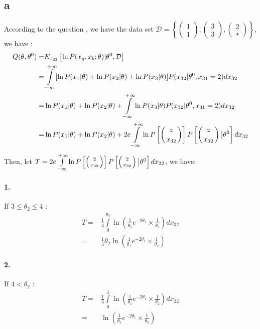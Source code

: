 \documentclass[]{article}
\begin{document}
    \subsection{a}
According to the question , we have the data set $\mathcal{D} = \left\{ \left(\begin{aligned}1\\1\end{aligned}\right),\left(\begin{aligned}3\\3\end{aligned}\right),\left(\begin{aligned}2\\\star\end{aligned}\right)\right\}$, we have :
\begin{align*}
	Q(\theta, \theta^0) =& E_{x_{32}} \left[ \ln P(x_g,x_b;\theta)|\theta^0,\mathcal{D} \right]\\
	=& \int \limits_{- \infty}^{+ \infty} [\ln P(x_1 |\theta) +\ln P(x_2|\theta) + \ln P(x_3|\theta)]P(x_{32}|\theta^0,x_{31} = 2)dx_{32} \\
	=&\ln P(x_1 |\theta) +\ln P(x_2|\theta) +  \int \limits_{- \infty}^{+ \infty} \ln P(x_3|\theta)P(x_{32}|\theta^0,x_{31} = 2)dx_{32} \\
	=&\ln P(x_1|\theta)+\ln P(x_2|\theta)+2e\int \limits_{- \infty}^{+ \infty} \ln P\left[\left( \scriptstyle 2 \atop x_{32}\right)\right]P\left[ \left(\scriptstyle 2 \atop x_{32} \right) \big | \theta^0\right]dx_{32} 
\end{align*}
Then, let $T = 2e\int \limits_{- \infty}^{+ \infty} \ln P\left[\left( \scriptstyle 2 \atop x_{32}\right)\right]P\left[ \left(\scriptstyle 2 \atop x_{32} \right) \big | \theta^0\right]dx_{32}$, we have:
\paragraph{1.} If $3 \leq \theta_2 \leq 4$ :
\begin{align*}
	T =& \frac{1}{4} \int \limits_0^{\theta_2} \ln \left( \frac{1}{\theta_1} e^{-2\theta_1} \times \frac{1}{\theta_2}\right)dx_{32}\\
	=&\frac{1}{4} \theta_2 \ln \left( \frac{1}{\theta_1} e^{-2\theta_1} \times \frac{1}{\theta_2}\right)
\end{align*}
\paragraph{2.} If $4 < \theta_2 $ :
\begin{align*}
	T =& \frac{1}{4} \int \limits_0^4 \ln \left( \frac{1}{\theta_1} e^{-2\theta_1} \times \frac{1}{\theta_2}\right)dx_{32}\\
	=& \ln \left( \frac{1}{\theta_1} e^{-2\theta_1} \times \frac{1}{\theta_2}\right)
\end{align*}
\end{document}
